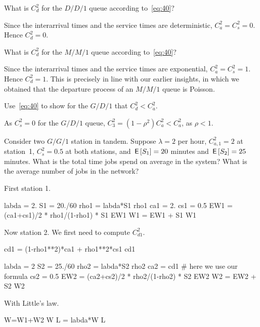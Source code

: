 \begin{exercise}
What is $C_d^2$ for the $D/D/1$ queue according to~\eqref{eq:40}?
\begin{solution}
  Since the interarrival times and the service times are deterministic, $C_a^2=C_s^2=0$. Hence $C_d^2=0$. 
\end{solution}
\end{exercise}

\begin{exercise}
What is $C_d^2$ for the $M/M/1$ queue according to~\eqref{eq:40}?  

\begin{solution}
  Since the interarrival times and the service times are exponential, $C_a^2=C_s^2=1$. Hence $C_d^2=1$. This is precisely in line with our earlier insights, in which we obtained that the departure process of an $M/M/1$ queue is Poisson.
\end{solution}
\end{exercise}

\begin{exercise}
  Use~\eqref{eq:40} to show for the $G/D/1$ that $C_d^2 < C_a^2$. 
  \begin{solution}
As $C_s^2 = 0$ for the $G/D/1$ queue, $C_3^2 = (1-\rho^2) C_a^2 < C_a^2$, as $\rho<1$. 
  \end{solution}
\end{exercise}

\begin{exercise}
Consider two $G/G/1$ station in tandem. Suppose $\lambda=2$ per hour, $C_{a,1}^2=2$ at station~1, $C_s^2=0.5$ at both stations, and $\,\mathsf{E}\left[S_1\right]=20$ minutes and $\,\mathsf{E}\left[S_2\right]=25$ minutes. What is the total time jobs spend on average in the system? What is the average number of jobs in the network?

\begin{solution}
First station 1.
\begin{pyconsole}
labda = 2.
S1 = 20./60
rho1 = labda*S1
rho1
ca1 = 2.
cs1 = 0.5
EW1 = (ca1+cs1)/2 * rho1/(1-rho1) * S1
EW1
W1 = EW1 + S1
W1
\end{pyconsole}

Now station 2. We first need to compute $C_{d1}^2$. 

\begin{pyconsole}
cd1 = (1-rho1**2)*ca1 + rho1**2*cs1
cd1
\end{pyconsole}


\begin{pyconsole}
labda = 2
S2 = 25./60
rho2 = labda*S2
rho2
ca2 = cd1 # here we use our formula
cs2 = 0.5
EW2 = (ca2+cs2)/2 * rho2/(1-rho2) * S2
EW2
W2 = EW2 + S2
W2
\end{pyconsole}

With Little's law.
\begin{pyconsole}
W=W1+W2
W
L = labda*W
L
\end{pyconsole}


\end{solution}
\end{exercise}

